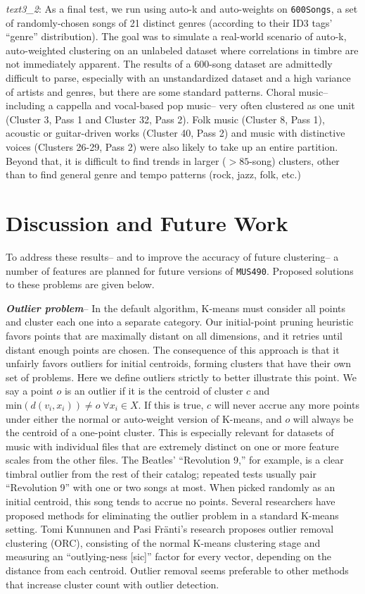 \documentclass[12pt,twocolumn,titlepage]{article}
\begin{document}
\emph{text3\_2}: As a final test, we run using auto-k and auto-weights on \texttt{600Songs}, a set of randomly-chosen songs of 21 distinct genres (according to their ID3 tags' ``genre'' distribution). The goal was to simulate a real-world scenario of auto-k, auto-weighted clustering on an unlabeled dataset where correlations in timbre are not immediately apparent. The results of a 600-song dataset are admittedly difficult to parse, especially with an unstandardized dataset and a high variance of artists and genres, but there are some standard patterns. Choral music-- including a cappella and vocal-based pop music-- very often clustered as one unit (Cluster 3, Pass 1 and Cluster 32, Pass 2). Folk music (Cluster 8, Pass 1), acoustic or guitar-driven works (Cluster 40, Pass 2) and music with distinctive voices (Clusters 26-29, Pass 2) were also likely to take up an entire partition. Beyond that, it is difficult to find trends in larger ($>85$-song) clusters, other than to find general genre and tempo patterns (rock, jazz, folk, etc.)


\section{Discussion and Future Work}
\label{sec:future}

	
To address these results-- and to improve the accuracy of future clustering-- a number of features are planned for future versions of \texttt{MUS490}. Proposed solutions to these problems are given below.

\emph{\textbf{Outlier problem}}-- In the default algorithm, K-means must consider all points and cluster each one into a separate category. Our initial-point pruning heuristic favors points that are maximally distant on all dimensions, and it retries until distant enough points are chosen. The consequence of this approach is that it unfairly favors outliers for initial centroids, forming clusters that have their own set of problems. Here we define outliers strictly to better illustrate this point. We say a point $o$ is an outlier if it is the centroid of cluster $c$ and $\mathrm{min}(d(v_i, x_i)) \neq o \; \forall x_i \in X$. If this is true, $c$ will never accrue any more points under either the normal or auto-weight version of K-means, and $o$ will always be the centroid of a one-point cluster. This is especially relevant for datasets of music with individual files that are extremely distinct on one or more feature scales from the other files. The Beatles' ``Revolution 9,'' for example, is a clear timbral outlier from the rest of their catalog; repeated tests usually pair ``Revolution 9'' with one or two songs at most. When picked randomly as an initial centroid, this song tends to accrue no points.
Several researchers have proposed methods for eliminating the outlier problem in a standard K-means setting. Tomi Kunnunen and Pasi Fr\"{a}nti's research proposes outlier removal clustering (ORC), consisting of the normal K-means clustering stage and measuring an ``outlying-ness [sic]'' factor for every vector, depending on the distance from each centroid. \cite{OutlierRemoval} \cite{Marghny} Outlier removal seems preferable to other methods that increase cluster count with outlier detection. 
\end{document}
